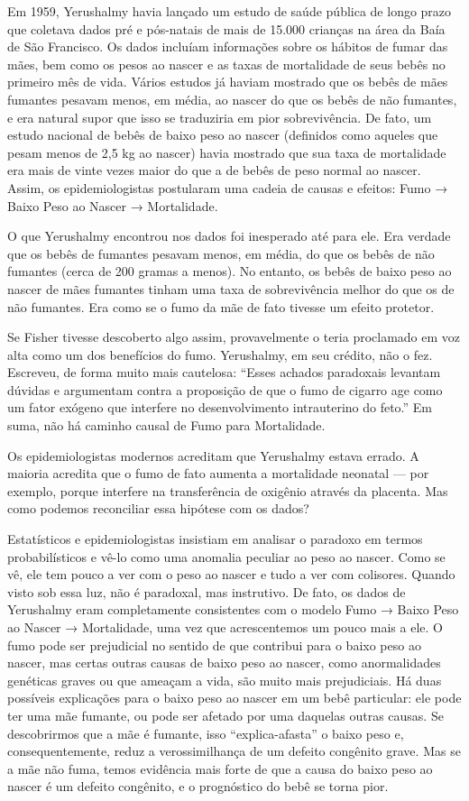 \documentclass[11pt,a5paper,twoside]{book}
\begin{document}
Em 1959, Yerushalmy havia lançado um estudo de saúde pública de longo prazo que coletava dados pré e pós-natais de mais de 15.000 crianças na área da Baía de São Francisco. Os dados incluíam informações sobre os hábitos de fumar das mães, bem como os pesos ao nascer e as taxas de mortalidade de seus bebês no primeiro mês de vida. Vários estudos já haviam mostrado que os bebês de mães fumantes pesavam menos, em média, ao nascer do que os bebês de não fumantes, e era natural supor que isso se traduziria em pior sobrevivência. De fato, um estudo nacional de bebês de baixo peso ao nascer (definidos como aqueles que pesam menos de 2,5 kg ao nascer) havia mostrado que sua taxa de mortalidade era mais de vinte vezes maior do que a de bebês de peso normal ao nascer. Assim, os epidemiologistas postularam uma cadeia de causas e efeitos: Fumo → Baixo Peso ao Nascer → Mortalidade.

O que Yerushalmy encontrou nos dados foi inesperado até para ele. Era verdade que os bebês de fumantes pesavam menos, em média, do que os bebês de não fumantes (cerca de 200 gramas a menos). No entanto, os bebês de baixo peso ao nascer de mães fumantes tinham uma taxa de sobrevivência melhor do que os de não fumantes. Era como se o fumo da mãe de fato tivesse um efeito protetor.

Se Fisher tivesse descoberto algo assim, provavelmente o teria proclamado em voz alta como um dos benefícios do fumo. Yerushalmy, em seu crédito, não o fez. Escreveu, de forma muito mais cautelosa: “Esses achados paradoxais levantam dúvidas e argumentam contra a proposição de que o fumo de cigarro age como um fator exógeno que interfere no desenvolvimento intrauterino do feto.” Em suma, não há caminho causal de Fumo para Mortalidade.

Os epidemiologistas modernos acreditam que Yerushalmy estava errado. A maioria acredita que o fumo de fato aumenta a mortalidade neonatal — por exemplo, porque interfere na transferência de oxigênio através da placenta. Mas como podemos reconciliar essa hipótese com os dados?

Estatísticos e epidemiologistas insistiam em analisar o paradoxo em termos probabilísticos e vê-lo como uma anomalia peculiar ao peso ao nascer. Como se vê, ele tem pouco a ver com o peso ao nascer e tudo a ver com colisores. Quando visto sob essa luz, não é paradoxal, mas instrutivo. De fato, os dados de Yerushalmy eram completamente consistentes com o modelo Fumo → Baixo Peso ao Nascer → Mortalidade, uma vez que acrescentemos um pouco mais a ele. O fumo pode ser prejudicial no sentido de que contribui para o baixo peso ao nascer, mas certas outras causas de baixo peso ao nascer, como anormalidades genéticas graves ou que ameaçam a vida, são muito mais prejudiciais. Há duas possíveis explicações para o baixo peso ao nascer em um bebê particular: ele pode ter uma mãe fumante, ou pode ser afetado por uma daquelas outras causas. Se descobrirmos que a mãe é fumante, isso “explica-afasta” o baixo peso e, consequentemente, reduz a verossimilhança de um defeito congênito grave. Mas se a mãe não fuma, temos evidência mais forte de que a causa do baixo peso ao nascer é um defeito congênito, e o prognóstico do bebê se torna pior.
\end{document}
